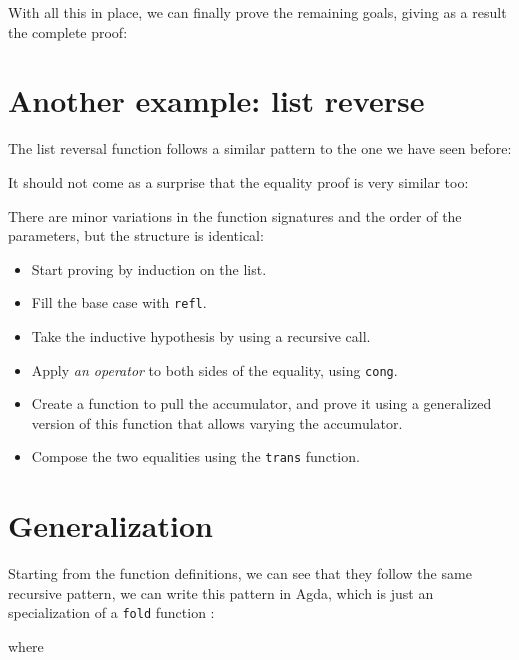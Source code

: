 \documentclass[runningheads]{llncs}
\begin{document}
With all this in place, we can finally prove the remaining goals, giving as a result the
complete proof:



\section{Another example: list reverse}

The list reversal function follows a similar pattern to the one we have seen before:



It should not come as a surprise that the equality proof is very similar too:



There are minor variations in the function signatures and the order of the parameters,
but the structure is identical:

\begin{itemize}
  \item Start proving by induction on the list.
  \item Fill the base case with \lstinline{refl}.
  \item Take the inductive hypothesis by using a recursive call.
  \item Apply \emph{an operator} to both sides of the equality, using \lstinline{cong}.
  \item Create a function to pull the accumulator, and prove it using a generalized
        version of this function that allows varying the accumulator.
  \item Compose the two equalities using the \lstinline{trans} function.
\end{itemize}

\section{Generalization}

Starting from the function definitions, we can see that they follow the same recursive
pattern, we can write this pattern in Agda, which is just an specialization of a
\lstinline{fold} function \cite{hutton1999tutorial,meijer1991functional}:



\noindent
where
\end{document}
